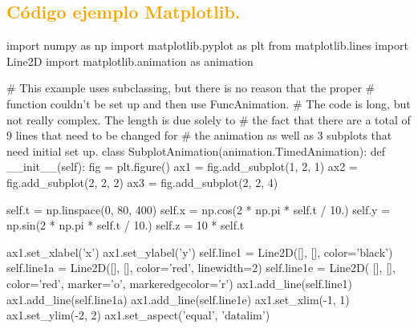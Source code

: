 \documentclass[12pt]{article}
\begin{document}
\subsection*{\textcolor{Orange}{Código ejemplo Matplotlib.}}
\begin{boxedverbatim}
import numpy as np
import matplotlib.pyplot as plt
from matplotlib.lines import Line2D
import matplotlib.animation as animation


# This example uses subclassing, but there is no reason that the proper
# function couldn't be set up and then use FuncAnimation. 
# The code is long, but not really complex. The length is due solely to 
# the fact that there are a total of 9 lines that need to be changed for 
# the animation as well as 3 subplots that need initial set up.
class SubplotAnimation(animation.TimedAnimation):
    def __init__(self):
        fig = plt.figure()
        ax1 = fig.add_subplot(1, 2, 1)
        ax2 = fig.add_subplot(2, 2, 2)
        ax3 = fig.add_subplot(2, 2, 4)

        self.t = np.linspace(0, 80, 400)
        self.x = np.cos(2 * np.pi * self.t / 10.)
        self.y = np.sin(2 * np.pi * self.t / 10.)
        self.z = 10 * self.t

        ax1.set_xlabel('x')
        ax1.set_ylabel('y')
        self.line1 = Line2D([], [], color='black')
        self.line1a = Line2D([], [], color='red', linewidth=2)
        self.line1e = Line2D(
            [], [], color='red', marker='o', markeredgecolor='r')
        ax1.add_line(self.line1)
        ax1.add_line(self.line1a)
        ax1.add_line(self.line1e)
        ax1.set_xlim(-1, 1)
        ax1.set_ylim(-2, 2)
        ax1.set_aspect('equal', 'datalim')
\end{boxedverbatim}

\pagebreak
\end{document}

